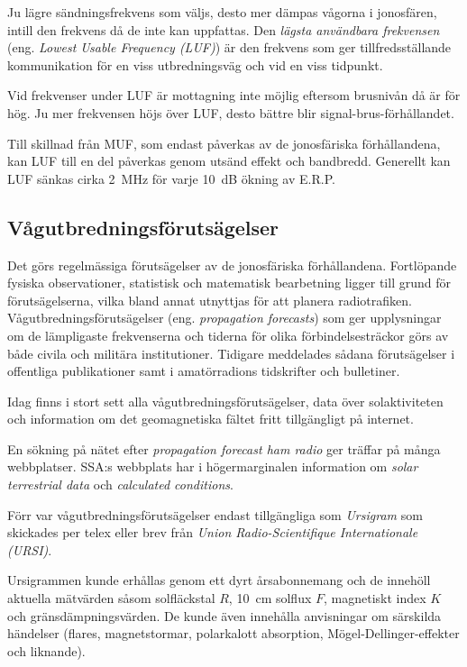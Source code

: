 Ju lägre sändningsfrekvens som väljs, desto mer dämpas vågorna i
jonosfären, intill den frekvens då de inte kan uppfattas.
Den \emph{lägsta användbara frekvensen}
(eng. \emph{Lowest Usable Frequency (LUF)}) är den
frekvens som ger tillfredsställande kommunikation för en viss
utbredningsväg och vid en viss tidpunkt.

Vid frekvenser under LUF är mottagning inte möjlig eftersom brusnivån
då är för hög.
Ju mer frekvensen höjs över LUF, desto bättre blir signal-brus-förhållandet.

Till skillnad från MUF, som endast påverkas av de jonosfäriska
förhållandena, kan LUF till en del påverkas genom utsänd effekt och bandbredd.
Generellt kan LUF sänkas cirka 2~MHz för varje 10~dB ökning av E.R.P.

\subsection{Vågutbredningsförutsägelser}

Det görs regelmässiga förutsägelser av de jonosfäriska förhållandena.
Fortlöpande fysiska observationer, statistisk och matematisk bearbetning ligger
till grund för förutsägelserna, vilka bland annat utnyttjas för att planera
radiotrafiken.
Vågutbredningsförutsägelser (eng. \emph{propagation forecasts}) som ger
upplysningar om de lämpligaste frekvenserna och tiderna för olika
förbindelsesträckor görs av både civila och militära institutioner.
Tidigare meddelades sådana förutsägelser i offentliga publikationer samt i
amatörradions tidskrifter och bulletiner.

Idag finns i stort sett alla vågutbredningsförutsägelser, data över
solaktiviteten och information om det geomagnetiska fältet fritt tillgängligt på
internet.

En sökning på nätet efter \emph{propagation forecast ham radio} ger träffar på
många webbplatser.
SSA:s webbplats har i högermarginalen information om \emph{solar terrestrial data}
och \emph{calculated conditions}.

Förr var vågutbredningsförutsägelser endast tillgängliga som \emph{Ursigram} som
skickades per telex eller brev från \emph{Union Radio-Scientifique
Internationale (URSI)}.

Ursigrammen kunde erhållas genom ett dyrt årsabonnemang och de innehöll aktuella
mätvärden såsom solfläckstal \(R\), 10~cm solflux \(F\), magnetiskt index \(K\)
och gränsdämpningsvärden.
De kunde även innehålla anvisningar om särskilda händelser (flares,
magnetstormar, polarkalott absorption, Mögel-Dellinger-effekter och liknande).


